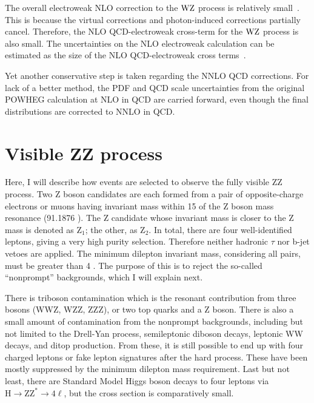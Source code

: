The overall electroweak NLO correction to the $\mathrm{W}\mathrm{Z}$ process is relatively small~\cite{Bierweiler:2013dja,Gieseke:2014gka,Baglio:113005}.
This is because the virtual corrections and photon-induced corrections partially cancel.
Therefore, the NLO QCD-electroweak cross-term for the $\mathrm{W}\mathrm{Z}$ process is also small.
The uncertainties on the NLO electroweak calculation can be estimated as the size of the NLO QCD-electroweak cross terms~\cite{Manohar:2016nzj,Alwall:2014hca,Frixione:2014qaa,Frixione:2015zaa}.


Yet another conservative step is taken regarding the NNLO QCD corrections.
For lack of a better method, the PDF and QCD scale uncertainties from the original POWHEG calculation at NLO in QCD are carried forward,
even though the final distributions are corrected to NNLO in QCD.

\clearpage
\section{Visible ZZ process}
\label{sec:zz4l}
Here, I will describe how events are selected to observe the fully visible ZZ process.
Two Z boson candidates are each formed from a pair of opposite-charge electrons or muons having invariant mass within 15 \GeV of the Z boson mass resonance (91.1876 \GeV).
The Z candidate whose invariant mass is closer to the Z mass is denoted as $\mathrm{Z}_1$; the other, as $\mathrm{Z}_2$.
In total, there are four well-identified leptons, giving a very high purity selection.
Therefore neither hadronic $\tau$ nor b-jet vetoes are applied.
The minimum dilepton invariant mass, considering all pairs, must be greater than 4 \GeV.
The purpose of this is to reject the so-called ``nonprompt'' backgrounds, which I will explain next.

There is triboson contamination which is the resonant contribution from three bosons (WWZ, WZZ, ZZZ), or two top quarks and a Z boson.
There is also a small amount of contamination from the nonprompt backgrounds,
including but not limited to the Drell-Yan process, semileptonic diboson decays, leptonic WW decays, and ditop production.
From these, it is still possible to end up with four charged leptons or fake lepton signatures after the hard process.
These have been mostly suppressed by the minimum dilepton mass requirement.
Last but not least, there are Standard Model Higgs boson decays to four leptons
via $\mathrm{H}\rightarrow \mathrm{ZZ^*} \rightarrow 4\ell$, 
but the cross section is comparatively small.

